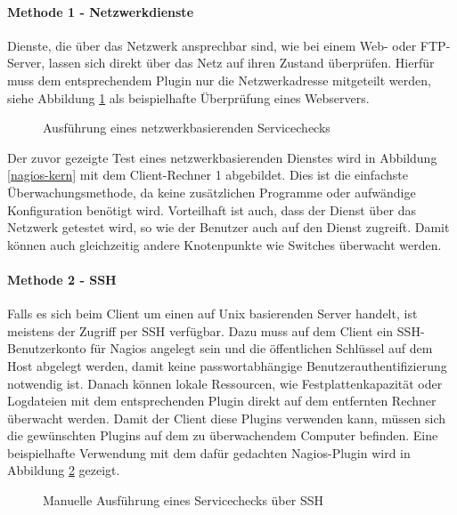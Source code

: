 \paragraph{Methode 1 - Netzwerkdienste}

Dienste, die über das Netzwerk ansprechbar sind, wie bei einem Web- oder \gls{FTP}-Server, lassen sich direkt über das Netz auf ihren Zustand überprüfen.
Hierfür muss dem entsprechendem Plugin nur die Netzwerkadresse mitgeteilt werden, siehe Abbildung \ref{check-http} als beispielhafte Überprüfung eines Webservers.
\begin{figure}[ht]  
	\centering
		\caption{Ausführung eines netzwerkbasierenden Servicechecks}
		\label{check-http}
\end{figure}

Der zuvor gezeigte Test eines netzwerkbasierenden Dienstes wird in Abbildung \ref{nagios-kern} mit dem Client-Rechner 1 abgebildet.
Dies ist die einfachste Überwachungsmethode, da keine zusätzlichen Programme oder aufwändige Konfiguration benötigt wird.
Vorteilhaft ist auch, dass der Dienst über das Netzwerk getestet wird, so wie der Benutzer auch auf den Dienst zugreift.
Damit können auch gleichzeitig andere Knotenpunkte wie Switches überwacht werden.

\paragraph{Methode 2 - SSH}
Falls es sich beim Client um einen auf Unix basierenden Server handelt, ist meistens der Zugriff per \gls{SSH} verfügbar.
Dazu muss auf dem Client ein \gls{SSH}-Benutzerkonto für Nagios angelegt sein und die öffentlichen Schlüssel auf dem Host abgelegt werden, damit keine passwortabhängige Benutzerauthentifizierung notwendig ist.
Danach können lokale Ressourcen, wie Festplattenkapazität oder Logdateien mit dem entsprechenden Plugin direkt auf dem entfernten Rechner überwacht werden.
Damit der Client diese Plugins verwenden kann, müssen sich die gewünschten Plugins auf dem zu überwachendem Computer befinden.
Eine beispielhafte Verwendung mit dem dafür gedachten Nagios-Plugin  wird in Abbildung \ref{check-ssh} gezeigt.
\begin{figure}[ht]
	\centering
		\caption{Manuelle Ausführung eines Servicechecks über SSH}
		\label{check-ssh}
\end{figure}

